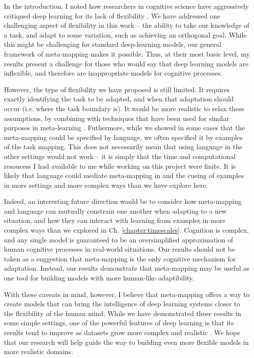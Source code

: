 In the introduction, I noted how researchers in cognitive science have aggressively critiqued deep learning for its lack of flexibility \citep[e.g.][]{Lake2015, Lake2016, Lake2017, Marcus2018}. We have addressed one challenging aspect of flexibility in this work -- the ability to take our knowledge of a task, and adapt to some variation, such as achieving an orthogonal goal. While this might be challenging for standard deep-learning models, our general framework of meta-mapping makes it possible. Thus, at their most basic level, my results present a challenge for those who would say that deep learning models are inflexible, and therefore are inappropriate models for cognitive processes. \par  
However, the type of flexibility we have proposed is still limited. It requires exactly identifying the task to be adapted, and when that adaptation should occur (i.e. where the task boundary is). It would be more realistic to relax these assumptions, by combining with techniques that have been used for similar purposes in meta-learning \citep[e.g.][]{Nagabandi2019}. Futhermore, while we showed in some cases that the meta-mapping could be specified by language, we often specified it by examples of the task mapping. This does not necessarily mean that using language in the other settings would not work -- it is simply that the time and computational resoucess I had available to me while working on this project were finite. It is likely that language could mediate meta-mapping in and the cueing of examples in more settings and more complex ways than we have explore here.\par 
Indeed, an interesting future direction would be to consider how meta-mapping and language can mutually constrain one another when adapting to a new situation, and how they can interact with learning from examples in more complex ways than we explored in Ch. \ref{chapter:timescales}. Cognition is complex, and any single model is guaranteed to be an oversimplified approximation of human cognitive processes in real-world situations. Our results should not be taken as a suggestion that meta-mapping is the only cognitive mechanism for adaptation. Instead, our results demonstrate that meta-mapping may be useful as one tool for building models with more human-like adaptibility. \par
With these caveats in mind, however, I believe that meta-mapping offers a way to create models that can bring the intelligence of deep learning systems closer to the flexibility of the human mind. While we have demonstrated these results in some simple settings, one of the powerful features of deep learning is that its results tend to improve as datasets grow more complex and realistic \citep{Hill2019a}. We hope that our research will help guide the way to building even more flexible models in more realistic domains. 

